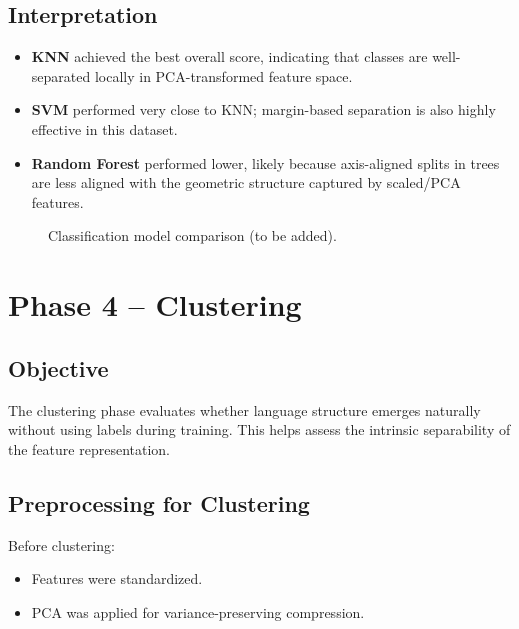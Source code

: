 \documentclass[a4paper,14pt]{extarticle}
\begin{document}
\subsection{Interpretation}
\begin{itemize}
    \item \textbf{KNN} achieved the best overall score, indicating that classes are well-separated locally in PCA-transformed feature space.
    \item \textbf{SVM} performed very close to KNN; margin-based separation is also highly effective in this dataset.
    \item \textbf{Random Forest} performed lower, likely because axis-aligned splits in trees are less aligned with the geometric structure captured by scaled/PCA features.
\end{itemize}

\begin{figure}[h]
    \centering
    \caption{Classification model comparison (to be added).}
    \label{fig:model_comparison_placeholder}
\end{figure}

\newpage
\section{Phase 4 -- Clustering}

\subsection{Objective}
The clustering phase evaluates whether language structure emerges naturally without using labels during training. This helps assess the intrinsic separability of the feature representation.

\subsection{Preprocessing for Clustering}
Before clustering:
\begin{itemize}
    \item Features were standardized.
    \item PCA was applied for variance-preserving compression.
\end{itemize}
\end{document}

